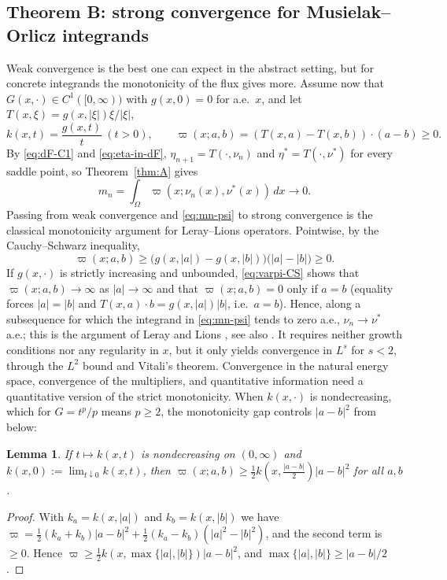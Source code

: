 \documentclass[11pt]{amsart}
\newtheorem{lemma}[theorem]{Lemma}
\theoremstyle{definition}
\theoremstyle{remark}
\numberwithin{equation}{section}
\newcommand{\dx}{\,dx}
\newcommand{\abs}[1]{\lvert #1\rvert}
\begin{document}
\subsection{Theorem B: strong convergence for Musielak--Orlicz integrands}\label{ssec:thmB}
Weak convergence is the best one can expect in the abstract setting, but for concrete integrands the monotonicity of the flux gives more. Assume now that $G(x,\cdot)\in C^1([0,\infty))$ with $g(x,0)=0$ for a.e.\ $x$, and let $T(x,\xi)=g(x,\abs\xi)\xi/\abs\xi$,
\[
k(x,t)=\frac{g(x,t)}t\ (t>0),\qquad \varpi(x;a,b)=(T(x,a)-T(x,b))\cdot(a-b)\ge0 .
\]
By \eqref{eq:dF-C1} and \eqref{eq:eta-in-dF}, $\eta_{n+1}=T(\cdot,\nu_n)$ and $\eta^*=T(\cdot,\nu^*)$ for every saddle point, so Theorem~\ref{thm:A} gives
\begin{equation}\label{eq:mn-psi}
m_n=\int_\Omega\varpi(x;\nu_n(x),\nu^*(x))\dx\to0 .
\end{equation}
Passing from weak convergence and \eqref{eq:mn-psi} to strong convergence is the classical monotonicity argument for Leray--Lions operators. Pointwise, by the Cauchy--Schwarz inequality,
\begin{equation}\label{eq:varpi-CS}
\varpi(x;a,b)\ge\big(g(x,\abs a)-g(x,\abs b)\big)\big(\abs a-\abs b\big)\ge0 .
\end{equation}
If $g(x,\cdot)$ is strictly increasing and unbounded, \eqref{eq:varpi-CS} shows that $\varpi(x;a,b)\to\infty$ as $\abs a\to\infty$ and that $\varpi(x;a,b)=0$ only if $a=b$ (equality forces $\abs a=\abs b$ and $T(x,a)\cdot b=g(x,\abs a)\abs b$, i.e.\ $a=b$). Hence, along a subsequence for which the integrand in \eqref{eq:mn-psi} tends to zero a.e., $\nu_n\to\nu^*$ a.e.; this is the argument of Leray and Lions \cite{LerayLions1965}, see also \cite{BoccardoMurat1992}. %
It requires neither growth conditions nor any regularity in $x$, but it only yields convergence in $L^s$ for $s<2$, through the $L^2$ bound and Vitali's theorem. Convergence in the natural energy space, convergence of the multipliers, and quantitative information need a quantitative version of the strict monotonicity. When $k(x,\cdot)$ is nondecreasing, which for $G=t^p/p$ means $p\ge2$, the monotonicity gap controls $\abs{a-b}^2$ from below:

\begin{lemma}\label{lem:psi}
If $t\mapsto k(x,t)$ is nondecreasing on $(0,\infty)$ and $k(x,0):=\lim_{t\downarrow0}k(x,t)$, then $\varpi(x;a,b)\ge\frac12k(x,\frac{\abs{a-b}}2)\abs{a-b}^2$ for all $a,b$.
\end{lemma}
\begin{proof}
With $k_a=k(x,\abs a)$ and $k_b=k(x,\abs b)$ we have $\varpi=\frac12(k_a+k_b)\abs{a-b}^2+\frac12(k_a-k_b)(\abs a^2-\abs b^2)$, and the second term is $\ge0$. Hence $\varpi\ge\frac12k(x,\max\{\abs a,\abs b\})\abs{a-b}^2$, and $\max\{\abs a,\abs b\}\ge\abs{a-b}/2$.
\end{proof}
\end{document}
